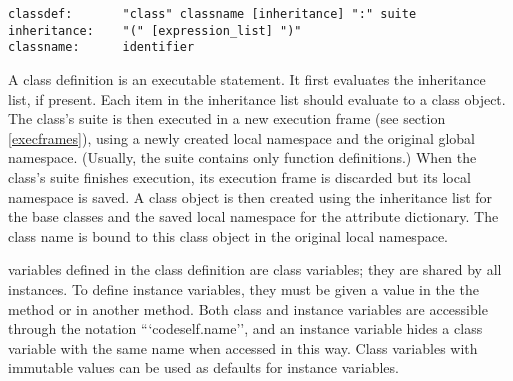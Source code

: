 \begin{verbatim}
classdef:       "class" classname [inheritance] ":" suite
inheritance:    "(" [expression_list] ")"
classname:      identifier
\end{verbatim}

A class definition is an executable statement.  It first evaluates the
inheritance list, if present.  Each item in the inheritance list
should evaluate to a class object.  The class's suite is then executed
in a new execution frame (see section \ref{execframes}), using a newly
created local namespace and the original global namespace.
(Usually, the suite contains only function definitions.)  When the
class's suite finishes execution, its execution frame is discarded but
its local namespace is saved.  A class object is then created using
the inheritance list for the base classes and the saved local
namespace for the attribute dictionary.  The class name is bound to this
class object in the original local namespace.

 variables defined in the class definition
are class variables; they are shared by all instances.  To define
instance variables, they must be given a value in the the
 method or in another method.  Both class and
instance variables are accessible through the notation
```code{self.name}'', and an instance variable hides a class variable
with the same name when accessed in this way.  Class variables with
immutable values can be used as defaults for instance variables.
